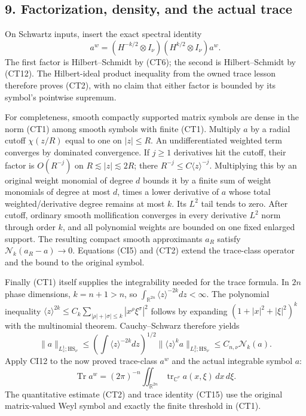 \documentclass[
  11pt,
]{article}
\begin{document}
\subsection{9. Factorization, density, and the actual
trace}\label{factorization-density-and-the-actual-trace}

On Schwartz inputs, insert the exact spectral identity \[
 a^w=(H^{-k/2}\otimes I_\nu)
             (H^{k/2}\otimes I_\nu)a^w .
 \tag{CT13}
\] The first factor is Hilbert--Schmidt by (CT6); the second is
Hilbert--Schmidt by (CT12). The Hilbert-ideal product inequality from
the owned trace lesson therefore proves (CT2), with no claim that either
factor is bounded by its symbol's pointwise supremum.

For completeness, smooth compactly supported matrix symbols are dense in
the norm (CT1) among smooth symbols with finite (CT1). Multiply \(a\) by
a radial cutoff \(\chi(z/R)\) equal to one on \(|z|\le R\). An
undifferentiated weighted term converges by dominated convergence. If
\(j\ge1\) derivatives hit the cutoff, their factor is \(O(R^{-j})\) on
\(R\lesssim|z|\lesssim2R\); there \(R^{-j}\le C\langle z\rangle^{-j}\).
Multiplying this by an original weight monomial of degree \(d\) bounds
it by a finite sum of weight monomials of degree at most \(d\), times a
lower derivative of \(a\) whose total weighted/derivative degree remains
at most \(k\). Its \(L^2\) tail tends to zero. After cutoff, ordinary
smooth mollification converges in every derivative \(L^2\) norm through
order \(k\), and all polynomial weights are bounded on one fixed
enlarged support. The resulting compact smooth approximants \(a_R\)
satisfy \(\mathcal N_k(a_R-a)\to0\). Equations (CI5) and (CT2) extend
the trace-class operator and the bound to the original symbol.

Finally (CT1) itself supplies the integrability needed for the trace
formula. In \(2n\) phase dimensions, \(k=n+1>n\), so
\(\int_{\mathbb R^{2n}}\langle z\rangle^{-2k}dz<\infty\). The polynomial
inequality \(\langle z\rangle^{2k}\le C_k\sum_{|\rho|+|\sigma|\le k}
|x^\rho\xi^\sigma|^2\) follows by expanding \((1+|x|^2+|\xi|^2)^k\) with
the multinomial theorem. Cauchy--Schwarz therefore yields \[
 \|a\|_{L^1_{z};\mathrm{HS}_\nu}
 \le
 \left(\int\langle z\rangle^{-2k}dz\right)^{1/2}
 \|\langle z\rangle^k a\|_{L^2_z;\mathrm{HS}_\nu}
 \le C_{n,\nu}\mathcal N_k(a).
 \tag{CT14}
\] Apply CI12 to the now proved trace-class \(a^w\) and the actual
integrable symbol \(a\): \[
 \operatorname{Tr}a^w
  =(2\pi)^{-n}
       \iint_{\mathbb R^{2n}}
          \operatorname{tr}_{\mathbb C^\nu}a(x,\xi)\,dx\,d\xi .
 \tag{CT15}
\] The quantitative estimate (CT2) and trace identity (CT15) use the
original matrix-valued Weyl symbol and exactly the finite threshold in
(CT1).
\end{document}
